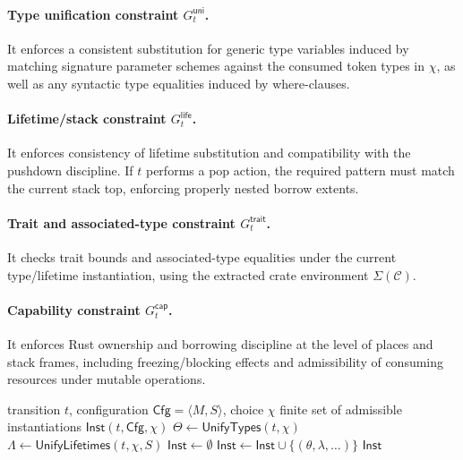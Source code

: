 \documentclass[sigconf]{acmart}
\begin{document}
\paragraph{Type unification constraint $G_t^{\mathsf{uni}}$.}
It enforces a consistent substitution for generic type variables induced by
matching signature parameter schemes against the consumed token types in $\chi$,
as well as any syntactic type equalities induced by where-clauses.

\paragraph{Lifetime/stack constraint $G_t^{\mathsf{life}}$.}
It enforces consistency of lifetime substitution and compatibility with the pushdown discipline.
If $t$ performs a pop action, the required pattern must match the current stack top,
enforcing properly nested borrow extents.

\paragraph{Trait and associated-type constraint $G_t^{\mathsf{trait}}$.}
It checks trait bounds and associated-type equalities under the current type/lifetime instantiation,
using the extracted crate environment $\Sigma(\mathcal{C})$.

\paragraph{Capability constraint $G_t^{\mathsf{cap}}$.}
It enforces Rust ownership and borrowing discipline at the level of places and stack frames,
including freezing/blocking effects and admissibility of consuming resources under mutable operations.

\begin{algorithm}[t]
\caption{$\mathsf{SolveGuard}(t,\mathsf{Cfg},\chi)$}
\label{alg:solve-guard}
\begin{algorithmic}[1]
\REQUIRE transition $t$, configuration $\mathsf{Cfg}=\langle M,S\rangle$, choice $\chi$
\ENSURE finite set of admissible instantiations $\mathsf{Inst}(t,\mathsf{Cfg},\chi)$
\STATE $\Theta \gets \mathsf{UnifyTypes}(t,\chi)$ 
\STATE $\Lambda \gets \mathsf{UnifyLifetimes}(t,\chi,S)$
\STATE $\mathsf{Inst}\gets \emptyset$
\FORALL{$(\theta,\lambda)\in \Theta\times \Lambda$}
     \STATE $\mathsf{Inst}\gets \mathsf{Inst}\cup\{(\theta,\lambda,\dots)\}$
  \ENDIF
\ENDFOR
\RETURN $\mathsf{Inst}$
\end{algorithmic}
\end{algorithm}
\end{document}
